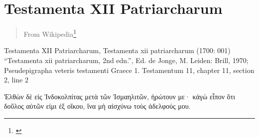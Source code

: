 \documentclass[12pt,letterpaper,twoside,final]{memoir}
\begin{document}
\section{Testamenta XII Patriarcharum}
\blockquote[From Wikipedia\footnote{\url{}}]{}
\begin{greek}

Testamenta XII Patriarcharum, Testamenta xii patriarcharum (1700: 001)
“Testamenta xii patriarcharum, 2nd edn.”, Ed. de Jonge, M.
Leiden: Brill, 1970; Pseudepigrapha veteris testamenti Graece 1.
Testamentum 11, chapter 11, section 2, line 2

   Ἐλθὼν δὲ εἰς 
Ἰνδοκολπίτας μετὰ τῶν Ἰσμαηλιτῶν, ἠρώτουν με· κἀγὼ 
εἶπον ὅτι δοῦλος αὐτῶν εἰμι ἐξ οἴκου, ἵνα μὴ αἰσχύνω τοὺς 
ἀδελφούς μου. 

\end{greek}
\end{document}

